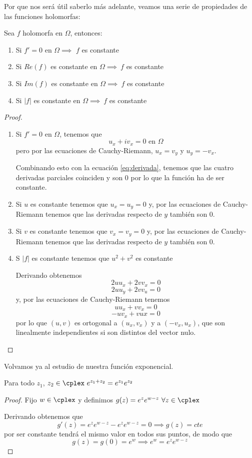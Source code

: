 \documentclass{apuntes}
\begin{document}
Por que nos será útil saberlo más adelante, veamos una serie de propiedades de las funciones holomorfas:
\begin{prop}
Sea $f$ holomorfa en $\Omega$, entonces:
\begin{enumerate}
\item Si $f'=0$ en $\Omega \implies $ $f$ es constante
\item Si $Re(f)$ es constante en $\Omega \implies \ f$ es constante
\item Si $Im(f)$ es constante en $\Omega \implies \ f$ es constante
\item Si $|f|$ es constante en $\Omega \implies \ f$ es constante
\end{enumerate}
\end{prop}
\begin{proof}
\begin{enumerate}
\item Si $f'=0$ en $\Omega$, tenemos que
\begin{equation}\label{eq:derivada}
u_x+iv_x = 0 \text{ en }\Omega
\end{equation}
pero por las ecuaciones de Cauchy-Riemann, $u_x=v_y$ y $u_y=-v_x$.

Combinando esto con la ecuación \eqref{eq:derivada}, tenemos que las cuatro derivadas parciales coinciden y son 0 por lo que la función ha de ser constante.

\item Si $u$ es constante tenemos que $u_x=u_y=0$ y, por las ecuaciones de Cauchy-Riemann tenemos que las derivadas respecto de $y$ también son 0.

\item Si $v$ es constante tenemos que $v_x=v_y=0$ y, por las ecuaciones de Cauchy-Riemann tenemos que las derivadas respecto de $y$ también son 0.

\item S $|f|$ es constante tenemos que $u^2+v^2$ es constante

Derivando obtenemos
\[2uu_x+2vv_x=0\]
\[2uu_y+2vv_u=0\]
y, por las ecuaciones de Cauchy-Riemann tenemos
\[uu_x+vv_x =0\]
\[-uv_x+vux = 0\]
por lo que $(u,v)$ es ortogonal a $(u_x,v_x)$ y a $(-v_x,u_x)$, que son linealmente independientes si son distintos del vector nulo.

\end{enumerate}
\end{proof}

Volvamos ya al estudio de nuestra función exponencial.
\begin{prop}
Para todo $z_1$, $z_2 \in \cplex \ e^{z_1+z_2}=e^{z_1}e^{z_2}$
\end{prop}
\begin{proof}
Fijo $w \in \cplex$ y definimos $g(z)=e^z e^{w-z} \ \forall z \in \cplex$

Derivando obtenemos que
\[g'(z)=e^z e^{w-z}-e^ze^{w-z}=0 \implies g(z)=cte\]
por ser constante tendrá el mismo valor en todos sus puntos, de modo que
\[g(z)=g(0)=e^w \implies e^w=e^ze^{w-z}\]
\end{proof}
\end{document}
